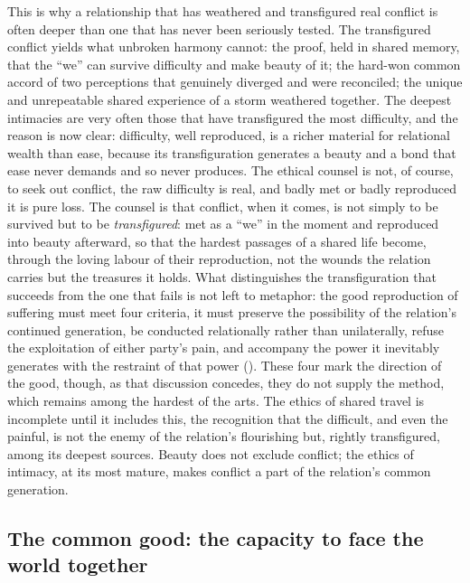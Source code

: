 This is why a relationship that has weathered and transfigured real conflict is often deeper than one that has never been seriously tested. The transfigured conflict yields what unbroken harmony cannot: the proof, held in shared memory, that the ``we'' can survive difficulty and make beauty of it; the hard-won common accord of two perceptions that genuinely diverged and were reconciled; the unique and unrepeatable shared experience of a storm weathered together. The deepest intimacies are very often those that have transfigured the most difficulty, and the reason is now clear: difficulty, well reproduced, is a richer material for relational wealth than ease, because its transfiguration generates a beauty and a bond that ease never demands and so never produces. The ethical counsel is not, of course, to seek out conflict, the raw difficulty is real, and badly met or badly reproduced it is pure loss. The counsel is that conflict, when it comes, is not simply to be survived but to be \emph{transfigured}: met as a ``we'' in the moment and reproduced into beauty afterward, so that the hardest passages of a shared life become, through the loving labour of their reproduction, not the wounds the relation carries but the treasures it holds. What distinguishes the transfiguration that succeeds from the one that fails is not left to metaphor: the good reproduction of suffering must meet four criteria, it must preserve the possibility of the relation's continued generation, be conducted relationally rather than unilaterally, refuse the exploitation of either party's pain, and accompany the power it inevitably generates with the restraint of that power (). These four mark the direction of the good, though, as that discussion concedes, they do not supply the method, which remains among the hardest of the arts. The ethics of shared travel is incomplete until it includes this, the recognition that the difficult, and even the painful, is not the enemy of the relation's flourishing but, rightly transfigured, among its deepest sources. Beauty does not exclude conflict; the ethics of intimacy, at its most mature, makes conflict a part of the relation's common generation.

\subsection{The common good: the capacity to face the world together}
\label{p21:sub:ethics-commongood}

